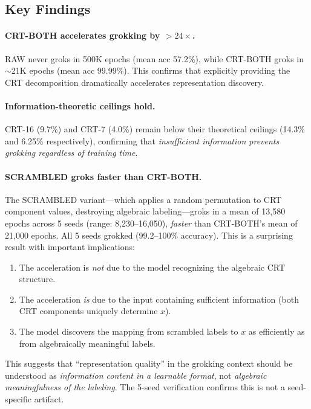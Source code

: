 \documentclass[11pt]{article}
\begin{document}
\subsection{Key Findings}

\paragraph{CRT-BOTH accelerates grokking by $>24\times$.}
RAW never groks in 500K epochs (mean acc 57.2\%), while CRT-BOTH groks in $\sim$21K epochs (mean acc 99.99\%). This confirms that explicitly providing the CRT decomposition dramatically accelerates representation discovery.

\paragraph{Information-theoretic ceilings hold.}
CRT-16 (9.7\%) and CRT-7 (4.0\%) remain below their theoretical ceilings (14.3\% and 6.25\% respectively), confirming that \emph{insufficient information prevents grokking regardless of training time}.

\paragraph{SCRAMBLED groks faster than CRT-BOTH.}
The SCRAMBLED variant---which applies a random permutation to CRT component values, destroying algebraic labeling---groks in a mean of 13,580 epochs across 5 seeds (range: 8,230--16,050), \emph{faster} than CRT-BOTH's mean of 21,000 epochs. All 5 seeds grokked (99.2--100\% accuracy). This is a surprising result with important implications:

\begin{enumerate}[leftmargin=*]
    \item The acceleration is \emph{not} due to the model recognizing the algebraic CRT structure.
    \item The acceleration \emph{is} due to the input containing sufficient information (both CRT components uniquely determine $x$).
    \item The model discovers the mapping from scrambled labels to $x$ as efficiently as from algebraically meaningful labels.
\end{enumerate}

This suggests that ``representation quality'' in the grokking context should be understood as \emph{information content in a learnable format}, not \emph{algebraic meaningfulness of the labeling}. The 5-seed verification confirms this is not a seed-specific artifact.
\end{document}
